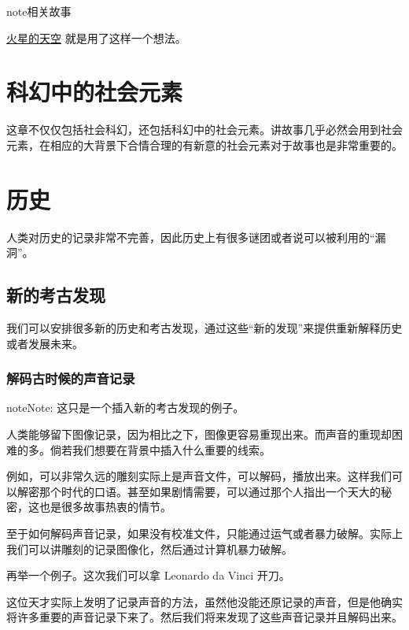 \documentclass[letterpaper,10pt,english]{sphinxmanual}
\begin{document}
\begin{notice}{note}{相关故事}

\href{http://multiverse.lamost.org/blog/6433}{火星的天空} 就是用了这样一个想法。
\end{notice}


\section{科幻中的社会元素}
\label{social::doc}\label{social:id1}
这章不仅仅包括社会科幻，还包括科幻中的社会元素。讲故事几乎必然会用到社会元素，在相应的大背景下合情合理的有新意的社会元素对于故事也是非常重要的。


\section{历史}
\label{history::doc}\label{history:id1}
人类对历史的记录非常不完善，因此历史上有很多谜团或者说可以被利用的“漏洞”。


\subsection{新的考古发现}
\label{history:id2}
我们可以安排很多新的历史和考古发现，通过这些“新的发现”来提供重新解释历史或者发展未来。


\subsubsection{解码古时候的声音记录}
\label{history:id3}
\begin{notice}{note}{Note:}
这只是一个插入新的考古发现的例子。
\end{notice}

人类能够留下图像记录，因为相比之下，图像更容易重现出来。而声音的重现却困难的多。倘若我们想要在背景中插入什么重要的线索。

例如，可以非常久远的雕刻实际上是声音文件，可以解码，播放出来。这样我们可以解密那个时代的口语。甚至如果剧情需要，可以通过那个人指出一个天大的秘密，这也是很多故事热衷的情节。

至于如何解码声音记录，如果没有校准文件，只能通过运气或者暴力破解。实际上我们可以讲雕刻的记录图像化，然后通过计算机暴力破解。

再举一个例子。这次我们可以拿 Leonardo da Vinci 开刀。

这位天才实际上发明了记录声音的方法，虽然他没能还原记录的声音，但是他确实将许多重要的声音记录下来了。然后我们将来发现了这些声音记录并且解码出来。
\end{document}
